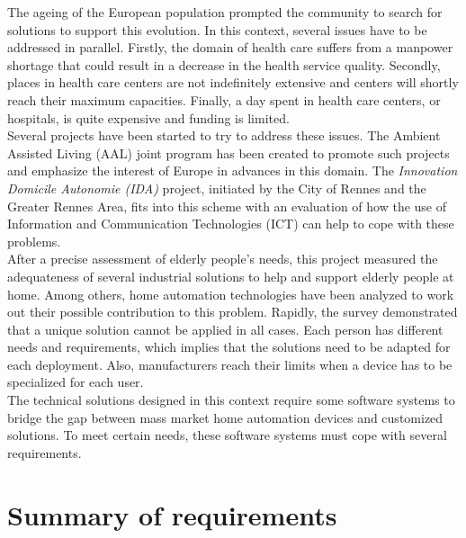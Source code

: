 The ageing of the European population prompted the community to search for solutions to support this evolution. In this context, several issues have to be addressed in parallel. Firstly, the domain of health care suffers from a manpower shortage that could result in a decrease in the health service quality. Secondly, places in health care centers are not indefinitely extensive and centers will shortly reach their maximum capacities. Finally, a day spent in health care centers, or hospitals, is quite expensive and funding is limited.\\
Several projects have been started to try to address these issues. The Ambient Assisted Living (AAL) joint program has been created to promote such projects and emphasize the interest of Europe in advances in this domain. The {\it Innovation Domicile Autonomie (IDA)} project, initiated by the City of Rennes and the Greater Rennes Area, fits into this scheme with an evaluation of how the use of Information and Communication Technologies (ICT) can help to cope with these problems.\\
After a precise assessment of elderly people's needs, this project measured the adequateness of several industrial solutions to help and support elderly people at home. Among others, home automation technologies have been analyzed to work out their possible contribution to this problem. Rapidly, the survey demonstrated that a unique solution cannot be applied in all cases. Each person has different needs and requirements, which implies that the solutions need to be adapted for each deployment. Also, manufacturers reach their limits when a device has to be specialized for each user.\\

The technical solutions designed in this context require some software systems to bridge the gap between mass market home automation devices and customized solutions. To meet certain needs, these software systems must cope with several requirements.

\section{Summary of requirements}
\label{sec:concluRequirements}

